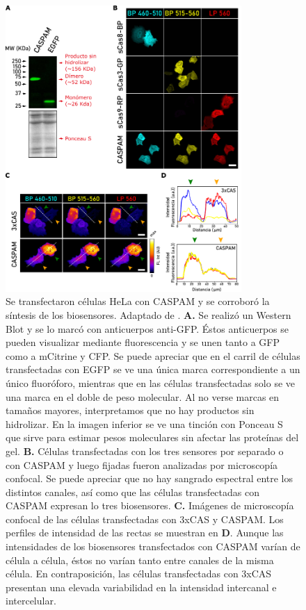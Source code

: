 \begin{figure}
    \centering
    \includegraphics[width=0.8\textwidth]{img/cap_3/transfeccion.pdf}
    \caption{\footnotesize{Se transfectaron células HeLa con CASPAM y se corroboró la síntesis de los biosensores. Adaptado de \cite{Habif2021}. \textbf{A.} Se realizó un Western Blot y se lo marcó con anticuerpos anti-GFP. Éstos anticuerpos se pueden visualizar mediante fluorescencia y se unen tanto a GFP como a mCitrine y CFP. Se puede apreciar que en el carril de células transfectadas con EGFP se ve una única marca correspondiente a un único fluoróforo, mientras que en las células transfectadas solo se ve una marca en el doble de peso molecular. Al no verse marcas en tamaños mayores, interpretamos que no hay productos sin hidrolizar. En la imagen inferior se ve una tinción con Ponceau S que sirve para estimar pesos moleculares sin afectar las proteínas del gel. \textbf{B.} Células transfectadas con los tres sensores por separado o con CASPAM y luego fijadas fueron analizadas por microscopía confocal. Se puede apreciar que no hay sangrado espectral entre los distintos canales, así como que las células transfectadas con CASPAM expresan lo tres biosensores. \textbf{C.} Imágenes de microscopía confocal de las células transfectadas con 3xCAS y CASPAM. Los perfiles de intensidad de las rectas se muestran en \textbf{D}. Aunque las intensidades de los biosensores transfectados con CASPAM varían de célula a célula, éstos no varían tanto entre canales de la misma célula. En contraposición, las células transfectadas con 3xCAS presentan una elevada variabilidad en la intensidad intercanal e intercelular.}}
    \label{fig:transfeccion}
\end{figure}

